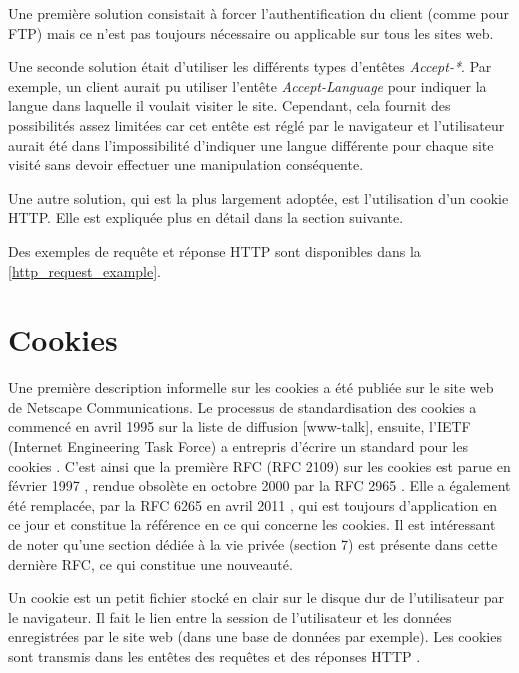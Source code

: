 Une première solution consistait à forcer l'authentification du client (comme pour FTP) mais ce n'est pas toujours nécessaire ou applicable sur tous les sites web.

Une seconde solution était d'utiliser les différents types d'entêtes \emph{Accept-*}. Par exemple, un client aurait pu utiliser l'entête \emph{Accept-Language} pour indiquer la langue dans laquelle il voulait visiter le site. Cependant, cela fournit des possibilités assez limitées car cet entête est réglé par le navigateur et l'utilisateur aurait été dans l'impossibilité d'indiquer une langue différente pour chaque site visité sans devoir effectuer une manipulation conséquente.

Une autre solution, qui est la plus largement adoptée, est l'utilisation d'un cookie HTTP. Elle est expliquée plus en détail dans la section suivante.
\newline

Des exemples de requête et réponse HTTP sont disponibles dans la \autoref{http_request_example}.


\section{Cookies}
Une première description informelle sur les cookies a été publiée sur le site web de Netscape Communications. Le processus de standardisation des cookies a commencé en avril 1995 sur la liste de diffusion [www-talk], ensuite, l'IETF (Internet Engineering Task Force) a entrepris d'écrire un standard pour les cookies \cite{Kristol:2001:HCS:502152.502153}. C'est ainsi que la première RFC (RFC 2109) sur les cookies est parue en février 1997 \cite{IETF_RFC2109}, rendue obsolète en octobre 2000 par la RFC 2965 \cite{IETF_RFC2965}. Elle a également été remplacée, par la RFC 6265 en avril 2011 \cite{IETF_RFC6265}, qui est toujours d'application en ce jour et constitue la référence en ce qui concerne les cookies. Il est intéressant de noter qu'une section dédiée à la vie privée (section 7) est présente dans cette dernière RFC, ce qui constitue une nouveauté.
\newline

Un cookie est un petit fichier stocké en clair sur le disque dur de l'utilisateur par le navigateur. Il fait le lien entre la session de l'utilisateur et les données enregistrées par le site web (dans une base de données par exemple). Les cookies sont transmis dans les entêtes des requêtes et des réponses HTTP \cite{IETF_RFC6265}.

